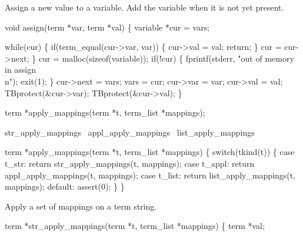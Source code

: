 

Assign a new value to a variable. Add the variable when it
is not yet present.

\nwenddocs{}\endmoddef\let\nwnotused=\nwoutput{}
void assign(term *var, term *val)
\{
  variable *cur = vars;

  while(cur) \{
    if(term_equal(cur->var, var)) \{
      cur->val = val;
      return;
    \}
    cur = cur->next;
  \}
  cur = malloc(sizeof(variable));
  if(!cur) \{
    fprintf(stderr, "out of memory in assign\\n");
    exit(1);
  \}
  cur->next = vars;
  vars = cur;
  cur->var = var;
  cur->val = val;
  TBprotect(&cur->var);
  TBprotect(&cur->val);
\}
\nwendcode{}\nwdocspar



\nwenddocs{}\endmoddef\let\nwnotused=\nwoutput{}
term *apply_mappings(term *t, term_list *mappings);

\LA{}str_apply_mappings~{\nwtagstyle{}}\RA{}
\LA{}appl_apply_mappings~{\nwtagstyle{}}\RA{}
\LA{}list_apply_mappings~{\nwtagstyle{}}\RA{}

term *apply_mappings(term *t, term_list *mappings)
\{
  switch(tkind(t)) \{
    case t_str:         return str_apply_mappings(t, mappings);
    case t_appl:        return appl_apply_mappings(t, mappings);
    case t_list:        return list_apply_mappings(t, mappings);
    default: assert(0);
  \}
\}
\nwendcode{}\nwdocspar


Apply a set of mappings on a term string.

\nwenddocs{}\endmoddef\let\nwnotused=\nwoutput{}
term *str_apply_mappings(term *t, term_list *mappings)
\{
  term *val;

